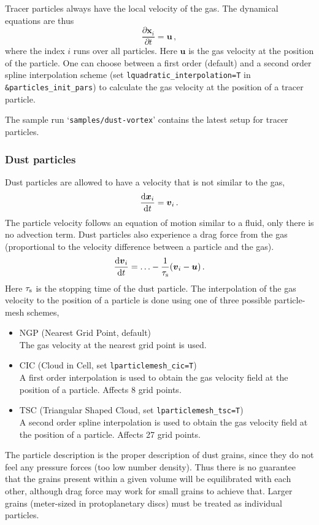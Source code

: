 \documentclass[\mydriver,12pt,twoside,notitlepage,a4paper]{article}
\makeatletter
\newcommand{\code}[1]{\texttt{#1}}
\newcommand{\file}[2][]{%
  \def\index@{#1}%
  `\texttt{#2}'%
  \ifx\index@\@empty\index[file]{#2@\texttt{#2}}%
  \else\index[file]{#1@\texttt{#1}}%
  \fi%
}
\renewcommand{\vec}[1]{{\boldsymbol #1}}
\newcommand{\dd}{{\rm d} {}}
\makeatother
\begin{document}
Tracer particles always have the local velocity of the gas. The dynamical
equations are thus
\begin{equation}
  \frac{\partial \vec{x}_i}{\partial t} = \vec{u} \, ,
\end{equation}
where the index $i$ runs over all particles. Here $\vec{u}$ is the gas velocity
at the position of the particle. One can choose between a first order (default)
and a second order spline interpolation scheme (set
\code{lquadratic_interpolation=T} in \code{\&particles_init_pars}) to
calculate the gas velocity at the position of a tracer particle.

The sample run \file{samples/dust-vortex} contains the latest setup for
tracer particles.

\subsubsection{Dust particles}

Dust particles are allowed to have a velocity that is not similar to the gas,
\begin{equation}
  \frac{\dd \vec{x}_i}{\dd t} = \vec{v}_i \, .
\end{equation}
The particle velocity follows an equation of motion similar to a fluid, only
there is no advection term. Dust particles also experience a drag force from
the gas (proportional to the velocity difference between a particle and the
gas).
\begin{equation}
  \frac{\dd \vec{v}_i}{\dd t} = \ldots -\frac{1}{\tau_{\rm s}}
  (\vec{v}_i-\vec{u}) \, .
\end{equation}
Here $\tau_{\rm s}$ is the stopping time of the dust particle. The
interpolation of the gas velocity to the position of a particle is done using
one of three possible particle-mesh schemes,
\begin{itemize}
  \item NGP (Nearest Grid Point, default)\\
    The gas velocity at the nearest grid point is used.
  \item CIC (Cloud in Cell, set \code{lparticlemesh_cic=T})\\
    A first order interpolation is used to obtain the gas velocity field at
    the position of a particle. Affects 8 grid points.
  \item TSC (Triangular Shaped Cloud, set \code{lparticlemesh_tsc=T})\\
    A second order spline interpolation is used to obtain the gas velocity
    field at the position of a particle. Affects 27 grid points.
\end{itemize}
The particle description is the proper description of
dust grains, since they do not feel any pressure forces (too low number
density). Thus there is no guarantee that the grains present within a given
volume will be equilibrated with each other, although drag force may work for
small grains to achieve that. Larger grains (meter-sized in protoplanetary
discs) must be treated as individual particles.
\end{document}
